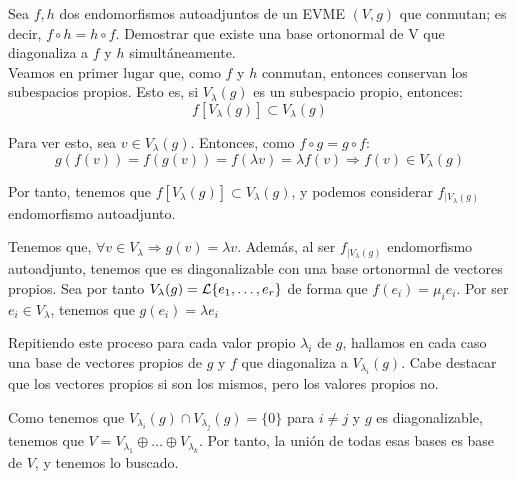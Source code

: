 \begin{ejercicio}
    Sea $f, h$ dos endomorfismos autoadjuntos de un EVME $(V, g)$ que conmutan; es decir, $f\circ h= h\circ f$. Demostrar que existe una base ortonormal de V que diagonaliza a $f$ y $h$ simultáneamente.\\

    Veamos en primer lugar que, como $f$ y $h$ conmutan, entonces conservan los subespacios propios. Esto es, si $V_\lambda(g)$ es un subespacio propio, entonces:
    \begin{equation*}
        f[V_\lambda(g)] \subset V_\lambda(g)
    \end{equation*}

    Para ver esto, sea $v\in V_\lambda(g)$. Entonces, como $f\circ g = g\circ f$:
    \begin{equation*}
        g(f(v)) = f(g(v)) = f(\lambda v) = \lambda f(v) \Longrightarrow f(v)\in V_\lambda(g)
    \end{equation*}
    
    Por tanto, tenemos que $f[V_\lambda(g)] \subset V_\lambda(g)$, y podemos considerar $f_{\big|V_\lambda(g)}$ endomorfismo autoadjunto.
    
    Tenemos que, $\forall v\in V_\lambda \Longrightarrow g(v)=\lambda v$. Además, al ser $f_{\big|V_\lambda(g)}$ endomorfismo autoadjunto, tenemos que es diagonalizable con una base ortonormal de vectores propios. Sea por tanto $V_\lambda(g)=\mathcal{L}\{e_1, \dots, e_r\}$ de forma que $f(e_i)=\mu_i e_i$. Por ser $e_i\in V_\lambda$, tenemos que $g(e_i)=\lambda e_i$

    Repitiendo este proceso para cada valor propio $\lambda_i$ de $g$, hallamos en cada caso una base de vectores propios de $g$ y $f$ que diagonaliza a $V_{\lambda_i}(g)$. Cabe destacar que los vectores propios si son los mismos, pero los valores propios no.
    
    Como tenemos que $V_{\lambda_i}(g)\cap V_{\lambda_j}(g)=\{0\}$ para $i\neq j$ y $g$ es diagonalizable, tenemos que $V=V_{\lambda_1}\oplus \dots \oplus V_{\lambda_k}$. Por tanto, la unión de todas esas bases es base de $V$, y tenemos lo buscado.
\end{ejercicio}

